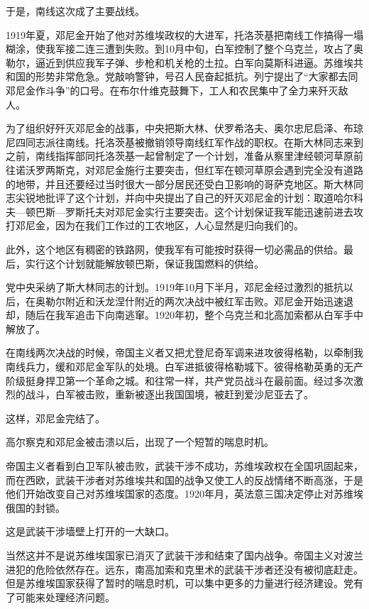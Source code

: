 于是，南线这次成了主要战线。

1919年夏，邓尼金开始了他对苏维埃政权的大进军，托洛茨基把南线工作搞得一塌糊涂，使我军接二连三遭到失败。到10月中旬，白军控制了整个乌克兰，攻占了奥勒尔，逼近到供应我军子弹、步枪和机关枪的土拉。白军向莫斯科进逼。苏维埃共和国的形势非常危急。党敲响警钟，号召人民奋起抵抗。列宁提出了“大家都去同邓尼金作斗争”的口号。在布尔什维克鼓舞下，工人和农民集中了全力来歼灭敌人。

为了组织好歼灭邓尼金的战事，中央把斯大林、伏罗希洛夫、奥尔忠尼启泽、布琼尼四同志派往南线。托洛茨基被撤销领导南线红军作战的职权。在斯大林同志来到之前，南线指挥部同托洛茨基一起曾制定了一个计划，准备从察里津经顿河草原前往诺沃罗两斯克，对邓尼金施行主要突击，但红军在顿河草原会遇到完全没有道路的地带，并且还要经过当时很大一部分居民还受白卫影响的哥萨克地区。斯大林同志尖锐地批评了这个计划，并向中央提出了自己的歼灭邓尼金的计划：取道哈尔科夫—顿巴斯—罗斯托夫对邓尼金实行主要突击。这个计划保证我军能迅速前进去攻打邓尼金，因为在我们工作过的工农地区，人心显然是归向我们的。

此外，这个地区有稠密的铁路网，使我军有可能按时获得一切必需品的供给。最后，实行这个计划就能解放顿巴斯，保证我国燃料的供给。

党中央采纳了斯大林同志的计划。1919年10月下半月，邓尼金经过激烈的抵抗以后，在奥勒尔附近和沃龙涅什附近的两次决战中被红军击败。邓尼金开始迅速退却，随后在我军追击下向南逃窜。1920年初，整个乌克兰和北高加索都从白军手中解放了。

在南线两次决战的时候，帝国主义者又把尤登尼奇军调来进攻彼得格勒，以牵制我南线兵力，缓和邓尼金军队的处境。白军进抵彼得格勒城下。彼得格勒英勇的无产阶级挺身捍卫第一个革命之城。和往常一样，共产党员战斗在最前面。经过多次激烈的战斗，白军被击败，重新被逐出我国国境，被赶到爱沙尼亚去了。

这样，邓尼金完结了。

高尔察克和邓尼金被击溃以后，出现了一个短暂的喘息时机。

帝国主义者看到白卫军队被击败，武装干涉不成功，苏维埃政权在全国巩固起来，而在西欧，武装干涉者对苏维埃共和国的战争又使工人的反战情绪不断高涨，于是他们开始改变自己对苏维埃国家的态度。1920年月，英法意三国决定停止对苏维埃俄国的封锁。

这是武装干涉墙壁上打开的一大缺口。

当然这并不是说苏维埃国家已消灭了武装干涉和结束了国内战争。帝国主义对波兰进犯的危险依然存在。远东，南高加索和克里术的武装干涉者还没有被彻底赶走。但是苏维埃国家获得了暂时的喘息时机，可以集中更多的力量进行经济建设。党有了可能来处理经济问题。

